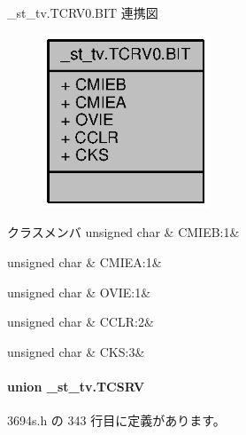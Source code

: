 \+\_\+st\+\_\+tv.\+T\+C\+R\+V0.\+B\+I\+T 連携図
\nopagebreak
\begin{figure}[H]
\begin{center}
\leavevmode
\includegraphics[width=141pt]{d9/d91/struct__st__tv_8TCRV0_8BIT__coll__graph}
\end{center}
\end{figure}
\begin{DoxyFields}{クラスメンバ}
unsigned char\label{3694s_8h_aad0cba9e06f911414ecff9ab14be1332}
&
C\+M\+I\+E\+B\+:1&
\\
\hline

unsigned char\label{3694s_8h_ade3ee7a7610dedd026f1401528a2d240}
&
C\+M\+I\+E\+A\+:1&
\\
\hline

unsigned char\label{3694s_8h_aa7afa262de6b4b0558b9e572e0f886a3}
&
O\+V\+I\+E\+:1&
\\
\hline

unsigned char\label{3694s_8h_ac3edc53cb9cfad8845e25009abc6d8f9}
&
C\+C\+L\+R\+:2&
\\
\hline

unsigned char\label{3694s_8h_a62e08e3df930b3022644f9943263a758}
&
C\+K\+S\+:3&
\\
\hline

\end{DoxyFields}
\label{union__st__tv_8TCSRV}
\paragraph{union \+\_\+st\+\_\+tv.\+T\+C\+S\+R\+V}


 3694s.\+h の 343 行目に定義があります。



